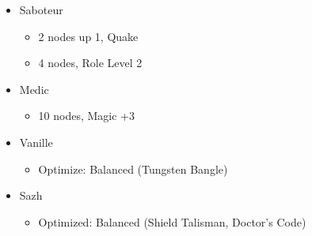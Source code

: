 \begin{menu}
\begin{multicols}{2}
\begin{itemize}
\begin{itemize}
\begin{itemize}
\begin{itemize}
                \item 2 nodes down 1, Fira
                \item 2 nodes, Role Level 2
            \end{itemize}
            \item Saboteur
            \begin{itemize}
                \item 2 nodes up 1, Quake
                \item 4 nodes, Role Level 2
            \end{itemize}
            \item Medic
            \begin{itemize}
                \item 10 nodes, Magic +3
            \end{itemize}
        \end{itemize}
    \end{itemize}
    \columnbreak
    \equip
    \begin{itemize}
        \item Vanille
        \begin{itemize}
            \item Optimize: Balanced (Tungsten Bangle)
        \end{itemize}
        \item Sazh
        \begin{itemize}
            \item Optimized: Balanced (Shield Talisman, Doctor's Code)
        \end{itemize}
    \end{itemize}
\end{itemize}
\end{multicols}
\end{menu}
\renewcommand{\first}{[1] Slash \& Burn (\com/\rav)}
\renewcommand{\second}{[2] War \& Peace (\com/\med)}
\renewcommand{\third}{[3] Tide Turner (\syn/\sab)}
\renewcommand{\fourth}{[4] }
\renewcommand{\fifth}{[5] Undermine (\rav/\sab)}
\renewcommand{\sixth}{[6] Divide \& Conquer (\com/\sab)}

